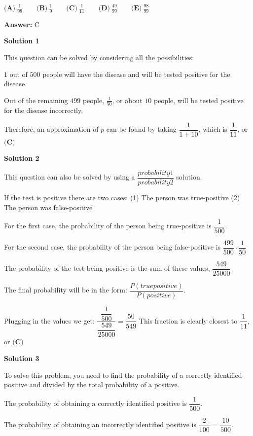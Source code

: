 \begin{enumerate}
 $\textbf{(A)}\ \frac{1}{98}\qquad\textbf{(B)}\ \frac{1}{9}\qquad\textbf{(C)}\ \frac{1}{11}\qquad\textbf{(D)}\ \frac{49}{99}\qquad\textbf{(E)}\ \frac{98}{99}$

 \textbf{Answer: }C



\textbf{Solution 1}

This question can be solved by considering all the possibilities:

 $1$ out of $500$ people will have the disease and will be tested positive for the disease.

 Out of the remaining $499$ people, $\frac{1}{50}$, or about $10$ people, will be tested positive for the disease incorrectly.

 Therefore, an approximation of $p$ can be found by taking $\dfrac{1}{1 +10}$, which is $\dfrac{1}{11}$, or $\boxed{\textbf{(C)}}$




\textbf{Solution 2}

This question can also be solved by using a $\dfrac{probability1}{probability2}$ solution. 

 If the test is positive there are two cases: (1) The person was true-positive (2) The person was false-positive

 For the first case, the probability of the person being true-positive is $\dfrac{1}{500}$.

 For the second case, the probability of the person being false-positive is $\dfrac{499}{500}\cdot\dfrac{1}{50}$

 The probability of the test being positive is the sum of these values, $\dfrac{549}{25000}$

 The final probability will be in the form: $\dfrac{P(true positive)}{P(positive)}$.

 Plugging in the values we get: $\dfrac{\dfrac{1}{500}}{\dfrac{549}{25000}}=\dfrac{50}{549}$ This fraction is clearly closest to  $\dfrac{1}{11}$, or $\boxed{\textbf{(C)}}$




\textbf{Solution 3}

To solve this problem, you need to find the probability of a correctly identified positive and divided by the total probability of a positive. 

 The probability of obtaining a correctly identified positive is $\dfrac{1}{500}$.

 The probability of obtaining an incorrectly identified positive is $\dfrac{2}{100}$ = $\dfrac{10}{500}$.


\end{enumerate}
